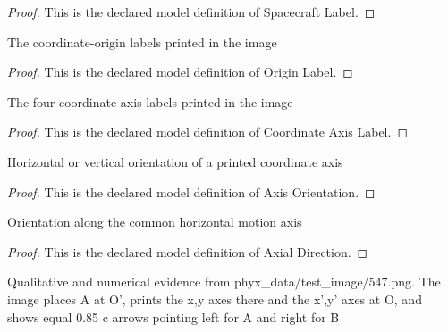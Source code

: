 \begin{proof}
  This is the declared model definition of Spacecraft Label.
\end{proof}
\begin{definition}
  \label{def:physics:phyx-mini-0547:phyxminiproblems-problemphyxmini0547-originlabel}
  The coordinate-origin labels printed in the image
\end{definition}
\begin{proof}
  This is the declared model definition of Origin Label.
\end{proof}
\begin{definition}
  \label{def:physics:phyx-mini-0547:phyxminiproblems-problemphyxmini0547-coordinateaxislabel}
  The four coordinate-axis labels printed in the image
\end{definition}
\begin{proof}
  This is the declared model definition of Coordinate Axis Label.
\end{proof}
\begin{definition}
  \label{def:physics:phyx-mini-0547:phyxminiproblems-problemphyxmini0547-axisorientation}
  Horizontal or vertical orientation of a printed coordinate axis
\end{definition}
\begin{proof}
  This is the declared model definition of Axis Orientation.
\end{proof}
\begin{definition}
  \label{def:physics:phyx-mini-0547:phyxminiproblems-problemphyxmini0547-axialdirection}
  Orientation along the common horizontal motion axis
\end{definition}
\begin{proof}
  This is the declared model definition of Axial Direction.
\end{proof}
\begin{definition}
  \label{def:physics:phyx-mini-0547:phyxminiproblems-problemphyxmini0547-opposingspacecraftfigure}
  Qualitative and numerical evidence from phyx\_data/test\_image/547.png. The image places A at O', prints the x,y axes there and the x',y' axes at O, and shows equal 0.85 c arrows pointing left for A and right for B
\end{definition}
